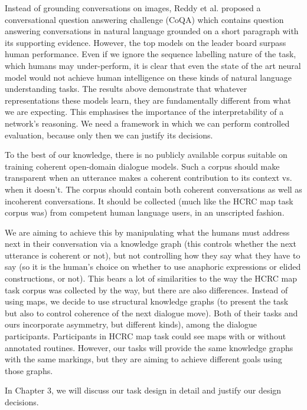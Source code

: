 \documentclass[bsc,frontabs,twoside,singlespacing,parskip,deptreport]{infthesis}     %
\begin{document}
Instead of grounding conversations on images, Reddy et al.\cite{reddy2019coqa} proposed a conversational question answering challenge (CoQA) which contains question answering conversations in natural language grounded on a short paragraph with its supporting evidence. However, the top models on the leader board surpass human performance. Even if we ignore the sequence labelling nature of the task, which humans may under-perform, it is clear that even the state of the art neural model would not achieve human intelligence on these kinds of natural language understanding tasks. The results above demonstrate that whatever representations these models learn, they are fundamentally different from what we are expecting. This emphasises the importance of the interpretability of a network's reasoning. We need a framework in which we can perform controlled evaluation, because only then we can justify its decisions.

To the best of our knowledge, there is no publicly available corpus suitable on training coherent open-domain dialogue models. Such a corpus should make transparent when an utterance makes a coherent contribution to its context vs. when it doesn't. The corpus should contain both coherent conversations as well as incoherent conversations. It should be collected (much like the HCRC map task corpus was) from competent human language users, in an unscripted fashion.

We are aiming to achieve this by manipulating what the humans must address next in their conversation via a knowledge graph (this controls whether the next utterance is coherent or not), but not controlling how they say what they have to say (so it is the human's choice on whether to use anaphoric expressions or elided constructions, or not). This bears a lot of similarities to the way the HCRC map task corpus was collected by the way, but there are also differences. Instead of using maps, we decide to use structural knowledge graphs (to present the task but also to control coherence of the next dialogue move). Both of their tasks and ours incorporate asymmetry, but different kinds), among the dialogue participants. Participants in HCRC map task could see maps with or without annotated routines. However, our tasks will provide the same knowledge graphs with the same markings, but they are aiming to achieve different goals using those graphs.

In Chapter 3, we will discuss our task design in detail and justify our design decisions. 
\end{document}
